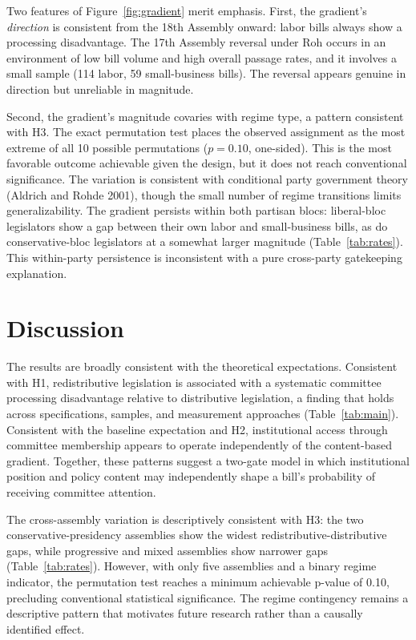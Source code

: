\documentclass[11pt]{article}
\begin{document}
Two features of Figure~\ref{fig:gradient} merit emphasis. First, the gradient's \emph{direction} is consistent from the 18th Assembly onward: labor bills always show a processing disadvantage. The 17th Assembly reversal under Roh occurs in an environment of low bill volume and high overall passage rates, and it involves a small sample (114 labor, 59 small-business bills). The reversal appears genuine in direction but unreliable in magnitude.

Second, the gradient's magnitude covaries with regime type, a pattern consistent with H3. The exact permutation test places the observed assignment as the most extreme of all 10 possible permutations ($p = 0.10$, one-sided). This is the most favorable outcome achievable given the design, but it does not reach conventional significance. The variation is consistent with conditional party government theory (Aldrich and Rohde 2001), though the small number of regime transitions limits generalizability. The gradient persists within both partisan blocs: liberal-bloc legislators show a gap between their own labor and small-business bills, as do conservative-bloc legislators at a somewhat larger magnitude (Table~\ref{tab:rates}). This within-party persistence is inconsistent with a pure cross-party gatekeeping explanation.


\section{Discussion}
\label{sec:discussion}

The results are broadly consistent with the theoretical expectations. Consistent with H1, redistributive legislation is associated with a systematic committee processing disadvantage relative to distributive legislation, a finding that holds across specifications, samples, and measurement approaches (Table~\ref{tab:main}). Consistent with the baseline expectation and H2, institutional access through committee membership appears to operate independently of the content-based gradient. Together, these patterns suggest a two-gate model in which institutional position and policy content may independently shape a bill's probability of receiving committee attention.

The cross-assembly variation is descriptively consistent with H3: the two conservative-presidency assemblies show the widest redistributive-distributive gaps, while progressive and mixed assemblies show narrower gaps (Table~\ref{tab:rates}). However, with only five assemblies and a binary regime indicator, the permutation test reaches a minimum achievable p-value of 0.10, precluding conventional statistical significance. The regime contingency remains a descriptive pattern that motivates future research rather than a causally identified effect.
\end{document}
